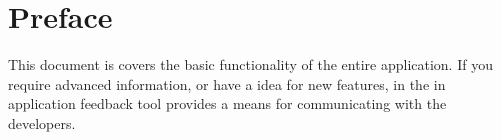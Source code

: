 \section{Preface}

This document is covers the basic functionality of the entire application. If you require advanced information, or have a idea for new features, in the in application feedback tool provides a means for communicating with the developers.
\setcounter{page}{1}